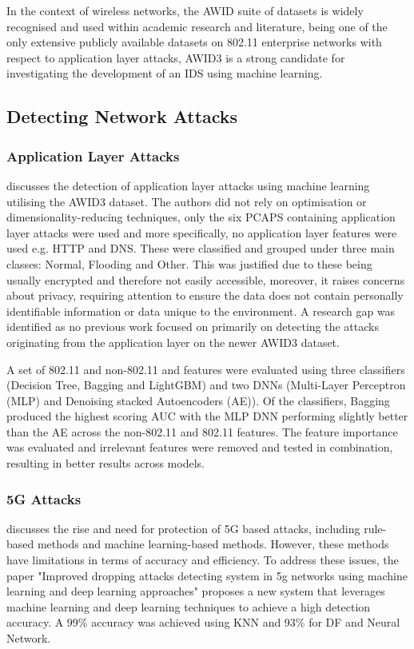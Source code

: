 In the context of wireless networks, the AWID suite of datasets is widely recognised and used within academic research and literature, being one of the only extensive publicly available datasets on 802.11 enterprise networks with respect to application layer attacks, AWID3 is a strong candidate for investigating the development of an IDS using machine learning. 

\subsection{Detecting Network Attacks}

\subsubsection*{Application Layer Attacks}

\textcite{s22155633} discusses the detection of application layer attacks using machine learning utilising the AWID3 dataset. The authors did not rely on optimisation or dimensionality-reducing techniques, only the six PCAPS containing application layer attacks were used and more specifically, no application layer features were used e.g. HTTP and DNS. These were classified and grouped under three main classes: Normal, Flooding and Other. This was justified due to these being usually encrypted and therefore not easily accessible, moreover, it raises concerns about privacy, requiring attention to ensure the data does not contain personally identifiable information or data unique to the environment. A research gap was identified as no previous work focused on primarily on detecting the attacks originating from the application layer on the newer AWID3 dataset.

A set of 802.11 and non-802.11 and features were evaluated using three classifiers (Decision Tree, Bagging and LightGBM) and two DNNs (Multi-Layer Perceptron (MLP) and Denoising stacked Autoencoders (AE)). Of the classifiers, Bagging produced the highest scoring AUC with the MLP DNN performing slightly better than the AE across the non-802.11 and 802.11 features. The feature importance was evaluated and irrelevant features were removed and tested in combination, resulting in better results across models. 

\subsubsection*{5G Attacks}

\textcite{Mughaid2022} discusses the rise and need for protection of 5G based attacks, including rule-based methods and machine learning-based methods. However, these methods have limitations in terms of accuracy and efficiency. To address these issues, the paper "Improved dropping attacks detecting system in 5g networks using machine learning and deep learning approaches" proposes a new system that leverages machine learning and deep learning techniques to achieve a high detection accuracy. A 99\% accuracy was achieved using KNN and 93\% for DF and Neural Network.

